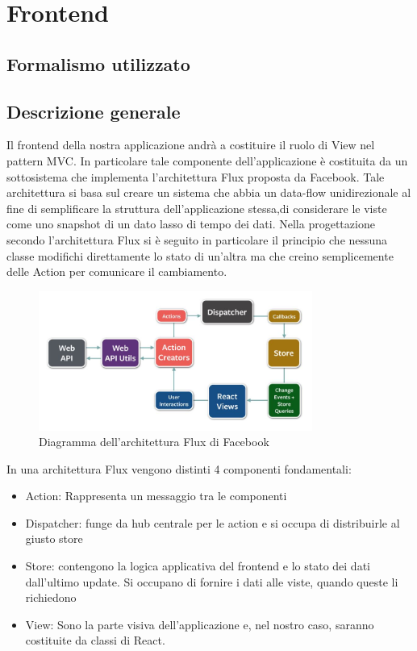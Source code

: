 \section{Frontend}
\subsection{Formalismo utilizzato}

\subsection{Descrizione generale}

Il frontend della nostra applicazione andrà a costituire il ruolo di View nel pattern MVC. In particolare tale componente dell'applicazione è costituita da un sottosistema che implementa l'architettura Flux proposta da Facebook. Tale architettura si basa sul creare un sistema che abbia un data-flow unidirezionale al fine di semplificare la struttura dell'applicazione stessa,di considerare le viste come uno snapshot di un dato lasso di tempo dei dati.
Nella progettazione secondo l'architettura Flux si è seguito in particolare il principio che nessuna classe modifichi direttamente lo stato di un'altra ma che creino semplicemente delle Action per comunicare il cambiamento.

\begin{figure}[h]
\centering
\includegraphics[width=0.8\textwidth]{res/sections/imgs/flux.jpg}
\caption{Diagramma dell'architettura Flux di Facebook}
\end{figure}
In una architettura Flux vengono distinti 4 componenti fondamentali:

\begin{itemize}
\item Action: Rappresenta un messaggio tra le componenti
\item Dispatcher: funge da hub centrale per le action e si occupa di distribuirle al giusto store
\item Store: contengono la logica applicativa del frontend e lo stato dei dati dall'ultimo update. Si occupano di fornire i dati alle viste, quando queste li richiedono
\item View: Sono la parte visiva dell'applicazione e, nel nostro caso, saranno costituite da classi di React.
\end{itemize}

